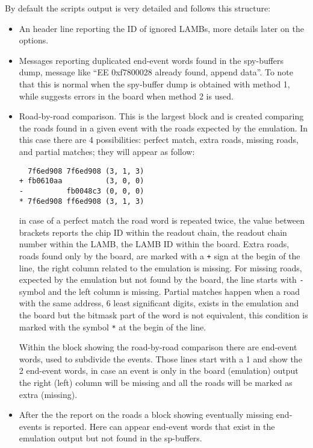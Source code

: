 By default the scripts output is very detailed and follows this structure:
\begin{itemize}
	\item An header line reporting the ID of ignored LAMBs, more details 
	later on the options.
	
	\item Messages reporting duplicated end-event words found in the spy-buffers
	dump, message like ``EE 0xf7800028 already found, append data''.
	To note that this is normal when the spy-buffer dump is obtained with method
	1, while suggests errors in the board when method 2 is used.
	
	\item Road-by-road comparison. This is the largest block and is created 
	comparing the roads found in a given event with the roads expected by the
	emulation. In this case there are 4 possibilities: perfect match, 
	extra roads, missing roads, and partial matches; they will appear as follow:
\begin{verbatim}
  7f6ed908 7f6ed908 (3, 1, 3)
+ fb0610aa          (3, 0, 0)
-          fb0048c3 (0, 0, 0)
* 7f6ed908 ff6ed908 (3, 1, 3)
\end{verbatim}	
	in case of a perfect match the road word is repeated twice, the value
	between brackets reports the chip ID within the readout chain, the readout
	chain number within the LAMB, the LAMB ID within the board. Extra roads, 
	roads found only by the board, are marked with a \texttt{+} sign at the
	begin of the line, the right column related to the emulation is missing.
	For missing roads, expected by the emulation but not found by the board,
	the line starts with \texttt{-} symbol and the left column is missing.
	Partial matches happen when a road with the same address, 6 least significant
	digits, exists in the emulation and the board but the bitmask part of the
	word is not equivalent, this condition is marked with the symbol 
	\texttt{*} at the begin of the line.
	
	Within the block showing the road-by-road comparison there are end-event
	words, used to subdivide the events. Those lines start with a 1 and show
	the 2 end-event words, in case an event is only in the board (emulation)
	output the right (left) column will be missing and all the roads
	will be marked as extra (missing).
	
	\item After the the report on the roads a block showing eventually missing
	end-events is reported. Here can appear end-event words that exist in the
	emulation output but not found in the sp-buffers.
	

\end{itemize}
